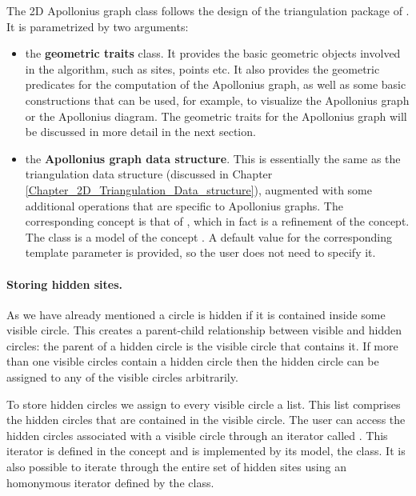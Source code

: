 The 2D Apollonius graph class
follows the design of the triangulation package of \cgal. It is
parametrized by two arguments:
\begin{itemize}
\item the {\bf geometric traits} class. It provides the basic
  geometric objects involved in the algorithm, such as sites, points
  etc. It also provides the geometric predicates for the computation
  of the Apollonius graph, as well as some basic constructions that
  can be used, for example, to visualize the Apollonius graph or the
  Apollonius diagram. The geometric traits for the Apollonius graph
  will be discussed in more detail in the next section.
\item the {\bf Apollonius graph data structure}. This is essentially
  the same as the triangulation data structure (discussed in Chapter
  \ref{Chapter_2D_Triangulation_Data_structure}), augmented with some
  additional operations that are specific to Apollonius graphs. The
  corresponding concept is that of
  , which in fact is a refinement
  of the  concept. The class
   is a model of
  the concept . A default value
  for the corresponding template parameter is provided, so the user
  does not need to specify it.
\end{itemize}

\paragraph{Storing hidden sites.}
As we have already mentioned a circle is hidden if it is contained
inside some visible circle. This creates a parent-child relationship
between visible and hidden circles: the parent of a hidden circle is the
visible circle that contains it. If more than one visible circles
contain a hidden circle then the hidden circle can be assigned to any of
the visible circles arbitrarily.

To store hidden circles we assign to every visible circle a list. This
list comprises the hidden circles that are contained in the
visible circle. The user can access the hidden circles associated with
a visible circle through an iterator called
. This iterator is defined in the
 concept and is implemented by its
model, the 
class. It is also possible to iterate through the entire set of hidden
sites using an homonymous iterator defined by the
 class. 

